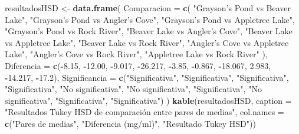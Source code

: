 \documentclass[
]{article}
\newenvironment{Shaded}{\begin{snugshade}}{\end{snugshade}}
\newcommand{\AttributeTok}[1]{\textcolor[rgb]{0.13,0.29,0.53}{#1}}
\newcommand{\FloatTok}[1]{\textcolor[rgb]{0.00,0.00,0.81}{#1}}
\newcommand{\FunctionTok}[1]{\textcolor[rgb]{0.13,0.29,0.53}{\textbf{#1}}}
\newcommand{\NormalTok}[1]{#1}
\newcommand{\OtherTok}[1]{\textcolor[rgb]{0.56,0.35,0.01}{#1}}
\newcommand{\SpecialCharTok}[1]{\textcolor[rgb]{0.81,0.36,0.00}{\textbf{#1}}}
\newcommand{\StringTok}[1]{\textcolor[rgb]{0.31,0.60,0.02}{#1}}
\begin{document}
\begin{Shaded}
\begin{Highlighting}[]
\NormalTok{resultadosHSD }\OtherTok{\textless{}{-}} \FunctionTok{data.frame}\NormalTok{(}
  \AttributeTok{Comparacion =} \FunctionTok{c}\NormalTok{(}
    \StringTok{"Grayson’s Pond vs Beaver Lake"}\NormalTok{,}
    \StringTok{"Grayson’s Pond vs Angler’s Cove"}\NormalTok{,}
    \StringTok{"Grayson’s Pond vs Appletree Lake"}\NormalTok{,}
    \StringTok{"Grayson’s Pond vs Rock River"}\NormalTok{,}
    \StringTok{"Beaver Lake vs Angler’s Cove"}\NormalTok{,}
    \StringTok{"Beaver Lake vs Appletree Lake"}\NormalTok{,}
    \StringTok{"Beaver Lake vs Rock River"}\NormalTok{,}
    \StringTok{"Angler’s Cove vs Appletree Lake"}\NormalTok{,}
    \StringTok{"Angler’s Cove vs Rock River"}\NormalTok{,}
    \StringTok{"Appletree Lake vs Rock River"}
\NormalTok{  ),}
  \AttributeTok{Diferencia =} \FunctionTok{c}\NormalTok{(}\SpecialCharTok{{-}}\FloatTok{8.15}\NormalTok{, }\SpecialCharTok{{-}}\FloatTok{12.00}\NormalTok{, }\SpecialCharTok{{-}}\FloatTok{9.017}\NormalTok{, }\SpecialCharTok{{-}}\FloatTok{26.217}\NormalTok{, }\SpecialCharTok{{-}}\FloatTok{3.85}\NormalTok{, }\SpecialCharTok{{-}}\FloatTok{0.867}\NormalTok{, }\SpecialCharTok{{-}}\FloatTok{18.067}\NormalTok{, }\FloatTok{2.983}\NormalTok{, }\SpecialCharTok{{-}}\FloatTok{14.217}\NormalTok{, }\SpecialCharTok{{-}}\FloatTok{17.2}\NormalTok{),}
  \AttributeTok{Significancia =} \FunctionTok{c}\NormalTok{(}\StringTok{"Significativa"}\NormalTok{, }\StringTok{"Significativa"}\NormalTok{, }\StringTok{"Significativa"}\NormalTok{, }\StringTok{"Significativa"}\NormalTok{,}
                    \StringTok{"No significativa"}\NormalTok{, }\StringTok{"No significativa"}\NormalTok{, }\StringTok{"Significativa"}\NormalTok{,}
                    \StringTok{"No significativa"}\NormalTok{, }\StringTok{"Significativa"}\NormalTok{, }\StringTok{"Significativa"}\NormalTok{)}
\NormalTok{)}
\FunctionTok{kable}\NormalTok{(resultadosHSD, }\AttributeTok{caption =} \StringTok{"Resultados Tukey HSD de comparación entre pares de medias"}\NormalTok{,}
      \AttributeTok{col.names =} \FunctionTok{c}\NormalTok{(}\StringTok{"Pares de medias"}\NormalTok{, }\StringTok{"Diferencia (mg/ml)"}\NormalTok{, }\StringTok{"Resultado Tukey HSD"}\NormalTok{))}
\end{Highlighting}
\end{Shaded}
\end{document}
